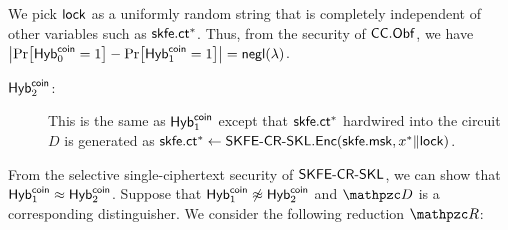 We pick $\lock$ as a uniformly random string that is completely independent of other variables such as $\skfe.\ct^*$.
Thus, from the security of $\CCObf$, we have $\abs{\Pr[\hybi{0}^\coin=1]-\Pr[\hybi{1}^\coin=1]}=\negl(\secp)$.

\begin{description}
\item[$\hybi{2}^\coin$:]This is the same as $\hybi{1}^\coin$ except
that $\skfe.\ct^*$ hardwired into the circuit $D$ is generated
as $\skfe.\ct^*\gets\SKFESKL.\Enc(\skfe.\msk,x^*\|\lock)$.
\end{description}


From the selective single-ciphertext security of $\SKFESKL$, we can show that
$\hybi{1}^\coin \approx \hybi{2}^\coin$. Suppose that $\Hyb_1^\coin
\not \approx \Hyb_2^\coin$ and $\qD$ is a corresponding
distinguisher. We consider the following reduction
$\qR$:

